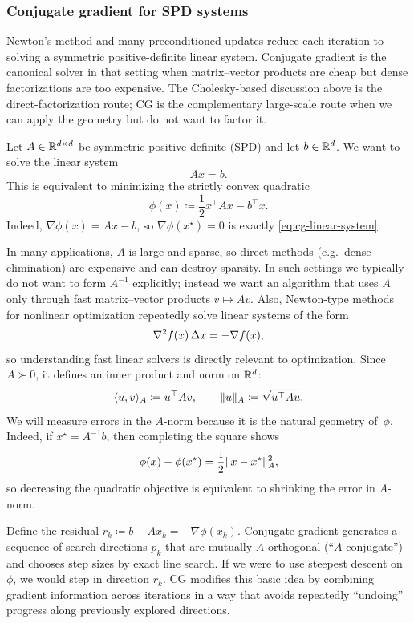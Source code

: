 \subsubsection{Conjugate gradient for SPD systems}
\label{subsec:conjugate-gradient}

Newton's method and many preconditioned updates reduce each iteration to solving a symmetric positive-definite linear system.
Conjugate gradient is the canonical solver in that setting when matrix--vector products are cheap but dense factorizations are too expensive.
The Cholesky-based discussion above is the direct-factorization route; CG is the complementary large-scale route when we can apply the geometry but do not want to factor it.

Let $A \in \mathbb{R}^{d\times d}$ be symmetric positive definite (SPD) and let $b \in \mathbb{R}^d$.
We want to solve the linear system
\begin{equation}
  Ax = b.
  \label{eq:cg-linear-system}
\end{equation}
This is equivalent to minimizing the strictly convex quadratic
\begin{equation}
  \phi(x) \coloneqq \frac12 x^\top A x - b^\top x.
  \label{eq:cg-quadratic}
\end{equation}
Indeed, $\nabla \phi(x) = Ax-b$, so $\nabla\phi(x^\star)=0$ is exactly \eqref{eq:cg-linear-system}.

In many applications, $A$ is large and sparse, so direct methods (e.g.\ dense elimination) are expensive and can destroy sparsity.
In such settings we typically do not want to form $A^{-1}$ explicitly; instead we want an algorithm that uses $A$ only through fast matrix--vector products $v\mapsto Av$.
Also, Newton-type methods for nonlinear optimization repeatedly solve linear systems of the form
\[
  \nabla^2 f(x)\,\Delta x = -\nabla f(x),
\]
so understanding fast linear solvers is directly relevant to optimization.
Since $A \succ 0$, it defines an inner product and norm on $\mathbb{R}^d$:
\[
  \langle u,v\rangle_A \coloneqq u^\top A v,
  \qquad
  \lVert u\rVert_A \coloneqq \sqrt{u^\top A u}.
\]
\label{subsubsec:a-norm}
We will measure errors in the $A$-norm because it is the natural geometry of~$\phi$.
Indeed, if $x^\star=A^{-1}b$, then completing the square shows
\[
  \phi(x)-\phi(x^\star)=\frac12\lVert x-x^\star\rVert_A^2,
\]
so decreasing the quadratic objective is equivalent to shrinking the error in $A$-norm.

Define the residual $r_k \coloneqq b-Ax_k = -\nabla\phi(x_k)$.
Conjugate gradient generates a sequence of search directions $p_k$ that are mutually $A$-orthogonal (``$A$-conjugate'') and chooses step sizes by exact line search.
If we were to use steepest descent on $\phi$, we would step in direction $r_k$.
CG modifies this basic idea by combining gradient information across iterations in a way that avoids repeatedly ``undoing'' progress along previously explored directions.
\label{subsubsec:cg-alg}

